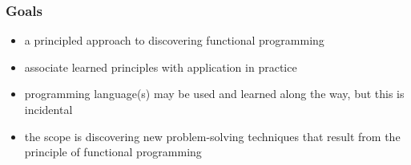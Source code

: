 \begin{frame}
\frametitle{Goals}

\begin{itemize}
  \item a principled approach to discovering functional programming
  \item associate learned principles with application in practice
  \item programming language(s) may be used and learned along the way, but this is incidental
  \item the scope is discovering new problem-solving techniques that result from the principle of functional programming
\end{itemize}
\end{frame}
